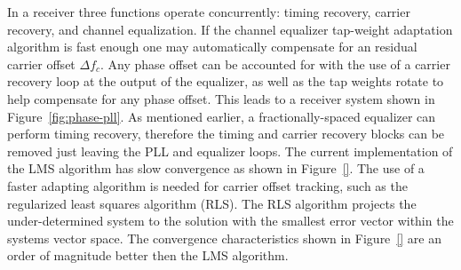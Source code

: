 In a receiver three functions operate concurrently: timing recovery, carrier recovery, and channel equalization. If the channel equalizer tap-weight adaptation algorithm is fast enough one may automatically compensate for an residual carrier offset $\Delta f_c$. Any phase offset can be accounted for with the use of a carrier recovery loop at the output of the equalizer, as well as the tap weights rotate to help compensate for any phase offset. This leads to a receiver system shown in Figure~\ref{fig:phase-pll}. As mentioned earlier, a fractionally-spaced equalizer can perform timing recovery, therefore the timing and carrier recovery blocks can be removed just leaving the PLL and equalizer loops. The current implementation of the LMS algorithm has slow convergence as shown in Figure~\ref{}. The use of a faster adapting algorithm is needed for carrier offset tracking, such as the regularized least squares algorithm (RLS). The RLS algorithm projects the under-determined system to the solution with the smallest error vector within the systems vector space. The convergence characteristics shown in Figure~\ref{} are an order of magnitude better then the LMS algorithm.